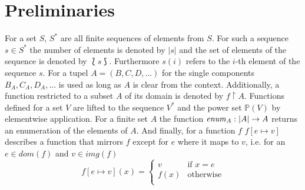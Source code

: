 \section{Preliminaries}
	For a set $S$, $S^{*}$ are all finite sequences of elements from $S$.
	For such a sequence $s\in S^{*}$ the number of elements is denoted by $|s|$
	and the set of elements of the sequence is denoted by $\Lbag s\Rbag$.
	Furthermore $s(i)$ refers to the $i$-th element of the sequence $s$.
	For a tupel $A = (B,C,D,...)$ for the single components
	$B_A,C_A,D_A,...$ is used as long as $A$ is clear from the context.
	Additionally, a function restricted to a subset $A$ of its domain is denoted
	by $f\upharpoonright{A}$.
	Functions defined for a set $V$ are lifted to the sequence
	$V^{*}$ and the power set $\mathbb{P}(V)$ by elementwise application.
	For a finite set $A$ the function $\mathit{enum}_{A}:|A|\rightarrow A$ returns an
	enumeration of the elements of $A$.
	And finally, for a function $f$ $f[e\mapsto v]$describes a function that
	mirrors $f$ except for $e$ where it maps to $v$, i.e. for an
	$e\in\mathit{dom}(f)$ and $v\in\mathit{img}(f)$ 
	\begin{equation*}
		f[e\mapsto v](x) =
		\begin{cases}
			v &\text{if } x = e\\
			f(x) &\text{otherwise}\\
		\end{cases}
	\end{equation*}

